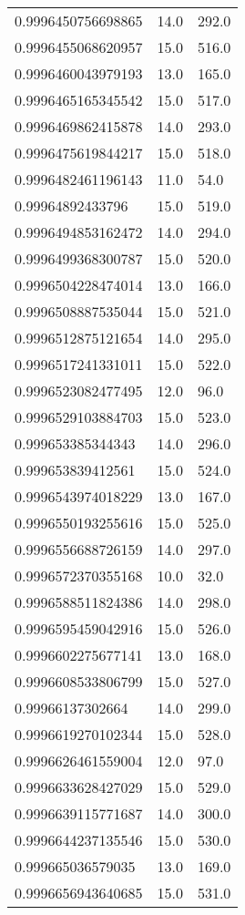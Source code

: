 \begin{center}
\begin{supertabular}[H]{p{0.30\textwidth}p{0.05\textwidth}p{0.05\textwidth}}
0.9996450756698865 & 14.0 & 292.0 \\ 
0.9996455068620957 & 15.0 & 516.0 \\ 
0.9996460043979193 & 13.0 & 165.0 \\ 
0.9996465165345542 & 15.0 & 517.0 \\ 
0.9996469862415878 & 14.0 & 293.0 \\ 
0.9996475619844217 & 15.0 & 518.0 \\ 
0.9996482461196143 & 11.0 & 54.0 \\ 
0.99964892433796 & 15.0 & 519.0 \\ 
0.9996494853162472 & 14.0 & 294.0 \\ 
0.9996499368300787 & 15.0 & 520.0 \\ 
0.9996504228474014 & 13.0 & 166.0 \\ 
0.9996508887535044 & 15.0 & 521.0 \\ 
0.9996512875121654 & 14.0 & 295.0 \\ 
0.9996517241331011 & 15.0 & 522.0 \\ 
0.9996523082477495 & 12.0 & 96.0 \\ 
0.9996529103884703 & 15.0 & 523.0 \\ 
0.999653385344343 & 14.0 & 296.0 \\ 
0.999653839412561 & 15.0 & 524.0 \\ 
0.9996543974018229 & 13.0 & 167.0 \\ 
0.9996550193255616 & 15.0 & 525.0 \\ 
0.9996556688726159 & 14.0 & 297.0 \\ 
0.9996572370355168 & 10.0 & 32.0 \\ 
0.9996588511824386 & 14.0 & 298.0 \\ 
0.9996595459042916 & 15.0 & 526.0 \\ 
0.9996602275677141 & 13.0 & 168.0 \\ 
0.9996608533806799 & 15.0 & 527.0 \\ 
0.99966137302664 & 14.0 & 299.0 \\ 
0.9996619270102344 & 15.0 & 528.0 \\ 
0.9996626461559004 & 12.0 & 97.0 \\ 
0.9996633628427029 & 15.0 & 529.0 \\ 
0.9996639115771687 & 14.0 & 300.0 \\ 
0.9996644237135546 & 15.0 & 530.0 \\ 
0.999665036579035 & 13.0 & 169.0 \\ 
0.9996656943640685 & 15.0 & 531.0 \\ 

\end{supertabular}
\end{center}
